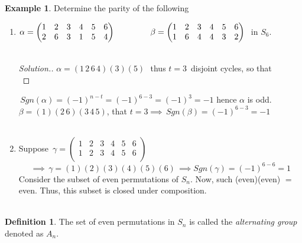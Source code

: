 \documentclass[11pt,a4paper]{article}
\theoremstyle{definition}
\newtheorem{defn}[thm]{Definition}
\newtheorem{exa}[thm]{Example}
\newenvironment{solution}
  {\renewcommand{\qedsymbol}{}\begin{proof}[\textit{Solution}.]}
  {\end{proof}}
\begin{document}
\begin{exa}
Determine the parity of the following
\end{exa}
\begin{enumerate}
\item $\alpha = \begin{pmatrix}
1 & 2 & 3 & 4 & 5 & 6\\
2 & 6 & 3 & 1 & 5 & 4\\
\end{pmatrix}\hspace{1.5cm}
\beta = \begin{pmatrix}
1 & 2 & 3 & 4 & 5 & 6\\
1 & 6 & 4 & 4 & 3 & 2\\
\end{pmatrix}\,\,$ in $S_6$.\\\\


\begin{solution}
$\alpha = (1\, 2\, 6\, 4)(3)(5)\,\,$ thus $t = 3\, $ disjoint cycles, so that\\
\end{solution}

 $\, Sgn(\alpha) = (-1)^{n-t} = (-1)^{6-3} = (-1)^3 = -1$ hence $\alpha$ is odd.\\

$\beta = (1)(2\,6)(3\,4\,5)$, that $t=3\implies \, Sgn(\beta) = (-1)^{6-3} = -1$\\\\



\item Suppose $\, \gamma = \begin{pmatrix}
1 & 2 & 3 & 4 & 5 & 6\\
1 & 2 & 3 & 4 & 5 & 6\\
\end{pmatrix}$
$$\implies\, \gamma = (1)(2)(3)(4)(5)(6)\, \implies Sgn(\gamma) = (-1)^{6-6} = 1$$
Consider the subset of even permutations of $S_n$. Now, such (even)(even) $= $ even. Thus, this subset is closed under composition.\\\\
\end{enumerate}









\begin{defn}
The set of even permutations in $S_n$ is called the \textit{alternating group} denoted as $A_n$.\\\\
\end{defn}
\end{document}
